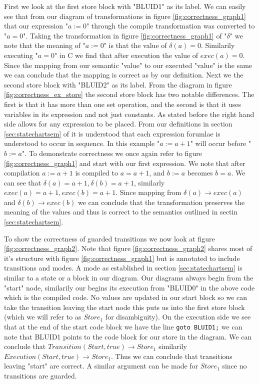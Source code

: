 First we look at the first store block with "BLUID1" as its label. We can easily see that from our diagram of transformations in figure \ref{fig:correctness_graph1} that our expression "$a := 0$" through the compile transformation was converted to "$a = 0$". Taking the transformation in figure \ref{fig:correctness_graph1} of "$\delta$" we note that the meaning of "$a := 0$" is that the value of $\delta(a) = 0$. Similarily executing "$a = 0$" in C we find that after execution the value of $exec(a) = 0$. Since the mapping from our semantic "value" to our executed "value" is the same we can conclude that the mapping is correct as by our definition. Next we the second store block with "BLUID2" as its label. From the diagram in figure \ref{fig:correctness_ex_store} the second store block has two notable differences. The first is that it has more than one set operation, and the second is that it uses variables in its expression and not just constants. As stated before the right hand side allows for any expression to be placed. From our definitions in section \ref{sec:statechartsem} of \plcchart it is understood that each expression forumlae is understood to occur in sequence. In this example "$a := a + 1$" will occur before "$b := a$". To demonstrate correctness we once again refer to figure \ref{fig:correctness_graph1} and start with our first expression. We note that after compilation $a := a + 1$ is compiled to $a = a + 1$, and $b := a$ becomes $b = a$. We can see that $\delta(a) = a + 1, \delta(b) = a + 1$, similarly $exec(a) = a + 1, exec(b) = a + 1$. Since mapping from $\delta(a) \rightarrow exec(a)$ and $\delta(b) \rightarrow exec(b)$ we can conclude that the transformation preserves the meaning of the values and thus is correct to the semantics outlined in sectin \ref{sec:statechartsem}.

To show the correctness of guarded transitions we now look at figure \ref{fig:correctness_graph2}. Note that figure \ref{fig:correctness_graph2} shares most of it's structure with figure \ref{fig:correctness_graph1} but is annotated to include transitions and modes. A mode as established in section \ref{sec:statechartsem} is similar to a state or a block in our diagram. Our diagrams always begin from the "start" node, similarily our begins its execution from "BLUID0" in the above code which is the compiled code. No values are updated in our start block so we can take the transition leaving the start node this puts us into the first store block (which we will refer to as $Store_1$ for disambiguity). On the execution side we see that at the end of the start code block we have the line \texttt{goto BLUID1;} we can note that BLUID1 points to the code block for our store in the diagram. We can conclude that $Transition(Start, true) \rightarrow Store_1$ similarily $Execution(Start, true) \rightarrow Store_1$. Thus we can conclude that transitions leaving "start" are correct. A similar argument can be made for $Store_1$ since no transitions are guarded.

